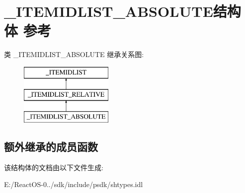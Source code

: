 \hypertarget{struct___i_t_e_m_i_d_l_i_s_t___a_b_s_o_l_u_t_e}{}\section{\+\_\+\+I\+T\+E\+M\+I\+D\+L\+I\+S\+T\+\_\+\+A\+B\+S\+O\+L\+U\+T\+E结构体 参考}
\label{struct___i_t_e_m_i_d_l_i_s_t___a_b_s_o_l_u_t_e}
类 \+\_\+\+I\+T\+E\+M\+I\+D\+L\+I\+S\+T\+\_\+\+A\+B\+S\+O\+L\+U\+TE 继承关系图\+:\begin{figure}[H]
\begin{center}
\leavevmode
\includegraphics[height=3.000000cm]{struct___i_t_e_m_i_d_l_i_s_t___a_b_s_o_l_u_t_e}
\end{center}
\end{figure}
\subsection*{额外继承的成员函数}


该结构体的文档由以下文件生成\+:\begin{DoxyCompactItemize}
\item 
E\+:/\+React\+O\+S-\/0../sdk/include/psdk/shtypes.\+idl\end{DoxyCompactItemize}
